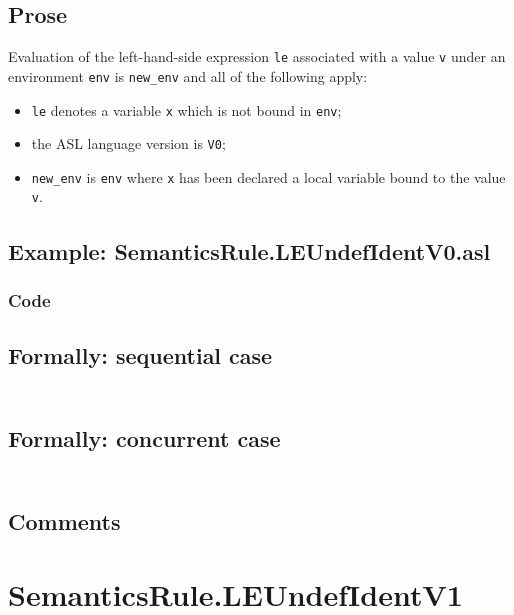 \documentclass{book}
\begin{document}
    \subsection{Prose}
    Evaluation of the left-hand-side expression \texttt{le} associated with a
value \texttt{v} under an environment \texttt{env} is \texttt{new\_env} and all
of the following apply:
    \begin{itemize}
    \item \texttt{le} denotes a variable \texttt{x} which is not bound in \texttt{env};
    \item the ASL language version is \texttt{V0};
    \item \texttt{new\_env} is \texttt{env} where \texttt{x} has been declared
a local variable bound to the value \texttt{v}.
    \end{itemize}

  \subsection{Example: SemanticsRule.LEUndefIdentV0.asl}

  \subsubsection{Code}

  \subsection{Formally: sequential case}
  \begin{align}
  \end{align} 

  \subsection{Formally: concurrent case}
  \begin{align}
  \end{align} 

  \subsection{Comments}

\section{SemanticsRule.LEUndefIdentV1 \label{sec:SemanticsRule.LEUndefIdentV1}}
\end{document}

